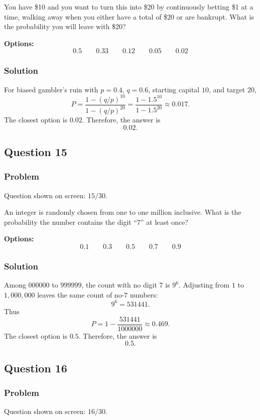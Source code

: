 \documentclass[12pt]{article}
\begin{document}
You have \$10 and you want to turn this into \$20 by continuously betting \$1 at a time, walking away when you either have a total of \$20 or are bankrupt. What is the probability you will leave with \$20?

\noindent\textbf{Options:}
\[
\boxed{0.5}
\qquad
\boxed{0.33}
\qquad
\boxed{0.12}
\qquad
\boxed{0.05}
\qquad
\boxed{0.02}
\]

\subsubsection{Solution}
For biased gambler's ruin with \(p=0.4\), \(q=0.6\), starting capital \(10\), and target \(20\),
\[
P=\frac{1-(q/p)^{10}}{1-(q/p)^{20}}
=
\frac{1-1.5^{10}}{1-1.5^{20}}
\approx 0.017.
\]
The closest option is \(0.02\). Therefore, the answer is
\[
\boxed{0.02}.
\]

\subsection{Question 15}
\subsubsection{Problem}
Question shown on screen: \(15/30\).

An integer is randomly chosen from one to one million inclusive. What is the probability the number contains the digit ``7'' at least once?

\noindent\textbf{Options:}
\[
\boxed{0.1}
\qquad
\boxed{0.3}
\qquad
\boxed{0.5}
\qquad
\boxed{0.7}
\qquad
\boxed{0.9}
\]

\subsubsection{Solution}
Among \(000000\) to \(999999\), the count with no digit \(7\) is \(9^6\). Adjusting from \(1\) to \(1{,}000{,}000\) leaves the same count of no-\(7\) numbers:
\[
9^6=531441.
\]
Thus
\[
P=1-\frac{531441}{1000000}\approx 0.469.
\]
The closest option is \(0.5\). Therefore, the answer is
\[
\boxed{0.5}.
\]

\subsection{Question 16}
\subsubsection{Problem}
Question shown on screen: \(16/30\).
\end{document}
